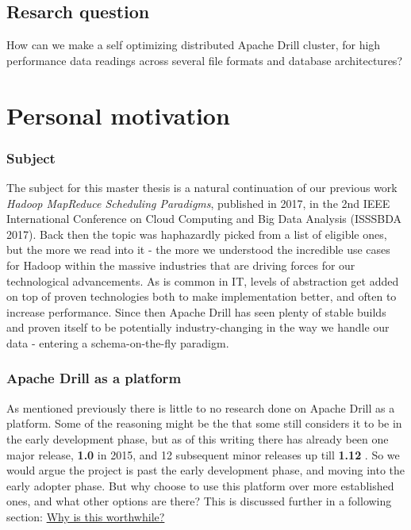 \documentclass[a4paper,english]{report}
\begin{document}
		\subsection{Resarch question}
		How can we make a self optimizing distributed Apache Drill cluster, for high performance data readings across several file formats and database architectures?
		
		\section{Personal motivation}
			\subsubsection{Subject}
			The subject for this master thesis is a natural continuation of our previous work \emph{Hadoop MapReduce Scheduling Paradigms}, published in 2017, in the 2nd IEEE International Conference on Cloud Computing and Big Data Analysis (ISSSBDA 2017). Back then the topic was haphazardly picked from a list of eligible ones, but the more we read into it - the more we understood the incredible use cases for Hadoop within the massive industries that are driving forces for our technological advancements. As is common in IT, levels of abstraction get added on top of proven technologies both to make implementation better, and often to increase performance. Since then Apache Drill has seen plenty of stable builds and proven itself to be potentially industry-changing in the way we handle our data - entering a schema-on-the-fly paradigm.
			
			\subsubsection{Apache Drill as a platform}
			As mentioned previously there is little to no research done on Apache Drill as a platform. Some of the reasoning might be the that some still considers it to be in the early development phase, but as of this writing there has already been one major release, \textbf{1.0} in 2015, and 12 subsequent minor releases up till \textbf{1.12} \cite{drill_releases}. So we would argue the project is past the early development phase, and moving into the early adopter phase. But why choose to use this platform over more established ones, and what other options are there? This is discussed further in a following section: \hyperref[sec:why_drill]{Why is this worthwhile?}
			
		
\end{document}
